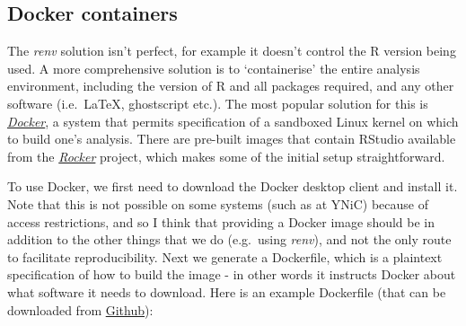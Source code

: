 \documentclass[
]{article}
\begin{document}
\hypertarget{docker-containers}{%
\subsection{Docker containers}\label{docker-containers}}

The \emph{renv} solution isn't perfect, for example it doesn't control the R version being used. A more comprehensive solution is to `containerise' the entire analysis environment, including the version of R and all packages required, and any other software (i.e.~\LaTeX{}, ghostscript etc.). The most popular solution for this is \href{https://www.docker.com/}{\emph{Docker}}, a system that permits specification of a sandboxed Linux kernel on which to build one's analysis. There are pre-built images that contain RStudio available from the \href{https://rocker-project.org/}{\emph{Rocker}} project, which makes some of the initial setup straightforward.

To use Docker, we first need to download the Docker desktop client and install it. Note that this is not possible on some systems (such as at YNiC) because of access restrictions, and so I think that providing a Docker image should be in addition to the other things that we do (e.g.~using \emph{renv}), and not the only route to facilitate reproducibility. Next we generate a Dockerfile, which is a plaintext specification of how to build the image - in other words it instructs Docker about what software it needs to download. Here is an example Dockerfile (that can be downloaded from \href{https://github.com/bakerdh/SizeAdaptation/blob/d3c12cf0a7aa9e9ac82013c30c8b254344946c0e/docker/Dockerfile}{Github}):
\end{document}
